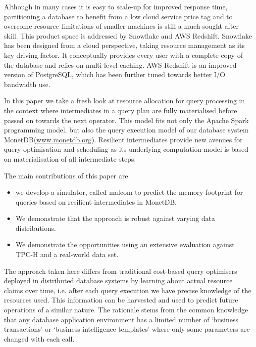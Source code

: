 \documentclass[conference]{IEEEtran}
\begin{document}
Although in many cases it is easy to scale-up for improved response time, partitioning a database to benefit from a low cloud service price tag and to overcome resource limitations of smaller machines is still a much sought after skill.
This product space is addressed by Snowflake and AWS Redshift.
Snowflake has been designed from a cloud perspective, taking resource management as its key driving factor.
It conceptually provides every user with a complete copy of the database and relies on multi-level caching.
AWS Redshift is an improved version of PostgreSQL, which has been further tuned towards better I/O bandwidth use.

In this paper we take a fresh look at resource allocation for query processing in the context where intermediates in a query plan are fully materialised before passed on towards the next operator.
This model fits not only the Apache Spark programming model, but also the query execution model of our database system MonetDB({\small\url{www.monetdb.org}}).
Resilient intermediates provide new avenues for query optimisation and scheduling as its underlying computation model is based on materialisation of all intermediate steps.

The main contributions of this paper are
\begin{itemize}
	\item we develop a simulator, called {\sc malcom} to predict the memory footprint for queries based on resilient intermediates in MonetDB.
	\item We demonstrate that the approach is robust against varying data distributions.
	\item We demonstrate the opportunities using an extensive evaluation against TPC-H and a real-world data set.
\end{itemize}

The approach taken here differs from traditional cost-based query optimisers deployed in distributed database systems by learning about actual resource claims over time, i.e. after each query execution we have precise knowledge of the resources used.
This information can be harvested and used to predict future operations of a similar nature.
The rationale stems from the common knowledge that any database application environment has a limited number of `business transactions' or `business intelligence templates' where only some parameters are changed with each call.
\end{document}
